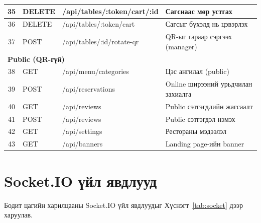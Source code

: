 \begin{longtable}{|c|l|p{4cm}|p{5.5cm}|}
35 & DELETE & /api/tables/:token/cart/:id & Сагснаас мөр устгах \\ \hline
36 & DELETE & /api/tables/:token/cart & Сагсыг бүхэлд нь цэвэрлэх \\ \hline
\rowcolor{LightBlue}
37 & POST & /api/tables/:id/rotate-qr & QR-ыг гараар сэргээх (manager) \\ \hline
\multicolumn{4}{|l|}{\textbf{Public (QR-гүй)}} \\ \hline
38 & GET & /api/menu/categories & Цэс ангилал (public) \\ \hline
\rowcolor{LightBlue}
39 & POST & /api/reservations & Online ширээний урьдчилан захиалга \\ \hline
40 & GET & /api/reviews & Public сэтгэгдлийн жагсаалт \\ \hline
\rowcolor{LightBlue}
41 & POST & /api/reviews & Public сэтгэгдэл нэмэх \\ \hline
42 & GET & /api/settings & Рестораны мэдээлэл \\ \hline
\rowcolor{LightBlue}
43 & GET & /api/banners & Landing page-ийн banner \\ \hline

\end{longtable}

\section{Socket.IO үйл явдлууд}

Бодит цагийн харилцааны Socket.IO үйл явдлуудыг Хүснэгт~\ref{tab:socket} дээр
харуулав.

